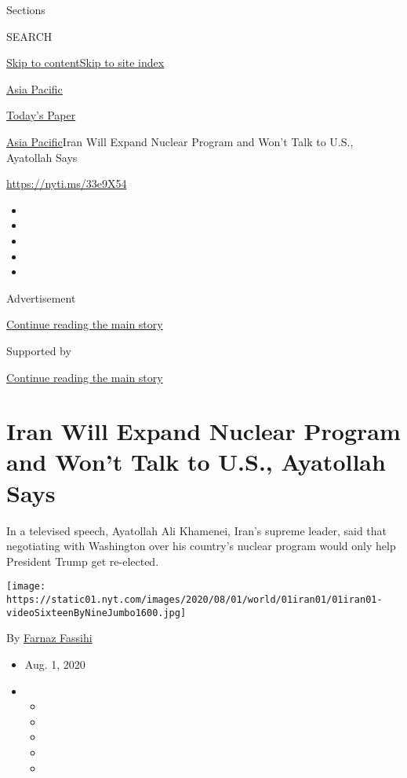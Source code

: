 Sections

SEARCH

\protect\hyperlink{site-content}{Skip to
content}\protect\hyperlink{site-index}{Skip to site index}

\href{https://www.nytimes.com/section/world/asia}{Asia Pacific}

\href{https://myaccount.nytimes.com/auth/login?response_type=cookie\&client_id=vi}{}

\href{https://www.nytimes.com/section/todayspaper}{Today's Paper}

\href{/section/world/asia}{Asia Pacific}\textbar{}Iran Will Expand
Nuclear Program and Won't Talk to U.S., Ayatollah Says

\url{https://nyti.ms/33e9X54}

\begin{itemize}
\item
\item
\item
\item
\item
\end{itemize}

Advertisement

\protect\hyperlink{after-top}{Continue reading the main story}

Supported by

\protect\hyperlink{after-sponsor}{Continue reading the main story}

\hypertarget{iran-will-expand-nuclear-program-and-wont-talk-to-us-ayatollah-says}{%
\section{Iran Will Expand Nuclear Program and Won't Talk to U.S.,
Ayatollah
Says}\label{iran-will-expand-nuclear-program-and-wont-talk-to-us-ayatollah-says}}

In a televised speech, Ayatollah Ali Khamenei, Iran's supreme leader,
said that negotiating with Washington over his country's nuclear program
would only help President Trump get re-elected.

\texttt{[image: https://static01.nyt.com/images/2020/08/01/world/01iran01/01iran01-videoSixteenByNineJumbo1600.jpg]}

By \href{https://www.nytimes.com/by/farnaz-fassihi}{Farnaz Fassihi}

\begin{itemize}
\item
  Aug. 1, 2020
\item
  \begin{itemize}
  \item
  \item
  \item
  \item
  \item
  \end{itemize}
\end{itemize}

